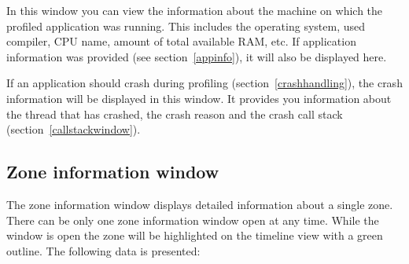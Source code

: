 \documentclass[hidelinks,titlepage,a4paper]{article}
\begin{document}
In this window you can view the information about the machine on which the profiled application was running. This includes the operating system, used compiler, CPU name, amount of total available RAM, etc. If application information was provided (see section~\ref{appinfo}), it will also be displayed here.

If an application should crash during profiling (section~\ref{crashhandling}), the crash information will be displayed in this window. It provides you information about the thread that has crashed, the crash reason and the crash call stack (section~\ref{callstackwindow}).

\subsection{Zone information window}
\label{zoneinfo}

The zone information window displays detailed information about a single zone. There can be only one zone information window open at any time. While the window is open the zone will be highlighted on the timeline view with a green outline. The following data is presented:
\end{document}
